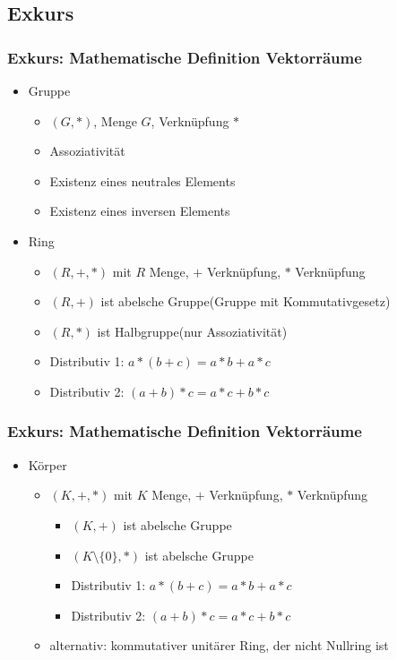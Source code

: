 \subsection{Exkurs}
\begin{frame}
    \frametitle{Exkurs: Mathematische Definition Vektorräume}
    \begin{itemize}
        \item Gruppe
        \begin{itemize}
            \item $(G,*)$, Menge $G$, Verknüpfung $*$
            \item Assoziativität
            \item Existenz eines neutrales Elements
            \item Existenz eines inversen Elements
        \end{itemize}
        \item Ring
        \begin{itemize}
            \item $(R,+,*)$ mit $R$ Menge, $+$ Verknüpfung, $*$ Verknüpfung
            \item $(R,+)$ ist abelsche Gruppe(Gruppe mit Kommutativgesetz)
            \item $(R,*)$ ist Halbgruppe(nur Assoziativität)
            \item Distributiv 1: $a * (b + c) = a * b + a * c$
            \item Distributiv 2: $(a + b) * c = a * c + b * c$
        \end{itemize}
    \end{itemize}
\end{frame}

\begin{frame}
    \frametitle{Exkurs: Mathematische Definition Vektorräume}
    \begin{itemize}
        \item Körper
        \begin{itemize}
            \item $(K,+,*)$ mit $K$ Menge, $+$ Verknüpfung, $*$ Verknüpfung
            \begin{itemize}
                \item $(K,+)$ ist abelsche Gruppe
                \item $(K\setminus\{0\},*)$ ist abelsche Gruppe
                \item Distributiv 1: $a * (b + c) = a * b + a * c$
                \item Distributiv 2: $(a + b) * c = a * c + b * c$
            \end{itemize}
            \item alternativ: kommutativer unitärer Ring, der nicht Nullring ist
        \end{itemize}
    \end{itemize}
\end{frame}

